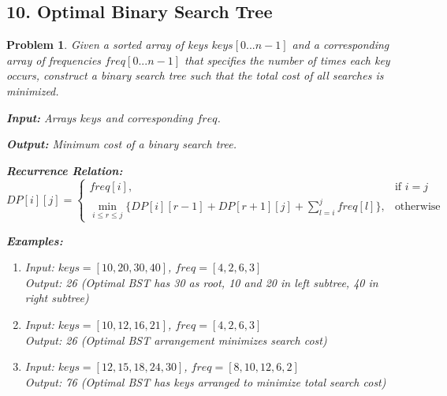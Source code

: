 \documentclass{article}
\newtheorem{problem}{Problem}
\begin{document}
\subsection*{10. Optimal Binary Search Tree}
\begin{problem}
Given a sorted array of keys $keys[0...n-1]$ and a corresponding array of frequencies $freq[0...n-1]$ that specifies the number of times each key occurs, construct a binary search tree such that the total cost of all searches is minimized.

\textbf{Input:} Arrays $keys$ and corresponding $freq$.

\textbf{Output:} Minimum cost of a binary search tree.

\textbf{Recurrence Relation:}
\[
DP[i][j] = 
\begin{cases}
freq[i], & \text{if } i = j \\
\min_{i \leq r \leq j} \{DP[i][r-1] + DP[r+1][j] + \sum_{l=i}^{j} freq[l]\}, & \text{otherwise}
\end{cases}
\]

\textbf{Examples:}
\begin{enumerate}
\item Input: $keys = [10, 20, 30, 40]$, $freq = [4, 2, 6, 3]$ \\
      Output: 26 (Optimal BST has 30 as root, 10 and 20 in left subtree, 40 in right subtree)
\item Input: $keys = [10, 12, 16, 21]$, $freq = [4, 2, 6, 3]$ \\
      Output: 26 (Optimal BST arrangement minimizes search cost)
\item Input: $keys = [12, 15, 18, 24, 30]$, $freq = [8, 10, 12, 6, 2]$ \\
      Output: 76 (Optimal BST has keys arranged to minimize total search cost)
\end{enumerate}
\end{problem}
\end{document}
